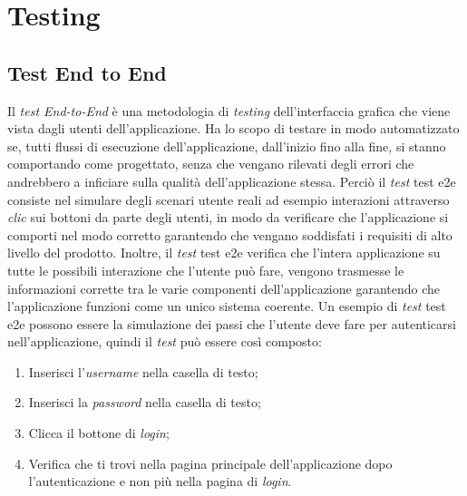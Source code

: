 
\chapter{Testing}
\label{cap:test}
\section{Test End to End}
Il \emph{test End-to-End} è una metodologia di \emph{testing} dell'interfaccia grafica che viene vista dagli utenti dell'applicazione. Ha lo scopo di testare in modo automatizzato se, tutti flussi di esecuzione dell'applicazione, dall'inizio fino alla fine, si stanno comportando come progettato, senza che vengano rilevati degli errori che andrebbero a inficiare sulla qualità dell’applicazione stessa. Perciò il \emph{test} \gls{test e2e} consiste nel simulare degli scenari utente reali ad esempio interazioni attraverso \emph{clic} sui bottoni da parte degli utenti, in modo da verificare che l'applicazione si comporti nel modo corretto garantendo che vengano soddisfati i requisiti di alto livello del prodotto. Inoltre, il \emph{test} \gls{test e2e} verifica che l'intera applicazione su tutte le possibili interazione che l'utente può fare, vengono trasmesse le informazioni corrette tra le varie componenti dell'applicazione garantendo che l'applicazione funzioni come un unico sistema coerente. Un esempio di \emph{test} \gls{test e2e} possono essere la simulazione dei passi che l'utente deve fare per autenticarsi nell'applicazione, quindi il \emph{test} può essere così composto:
\begin{enumerate}
	\item Inserisci l'\emph{username} nella casella di testo;
	\item Inserisci la \emph{password} nella casella di testo;
	\item Clicca il bottone di \emph{login};
	\item Verifica che ti trovi nella pagina principale dell'applicazione dopo l'autenticazione e non più nella pagina di \emph{login}.
\end{enumerate}

